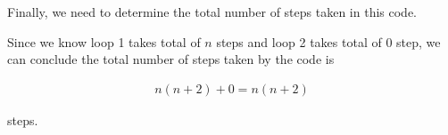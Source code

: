 \documentclass[12pt]{article}
\begin{document}
\begin{enumerate}[a.]
    \bigskip

    Finally, we need to determine the total number of steps taken in this code.

    \bigskip

    Since we know loop 1 takes total of $n$ steps and loop 2 takes total of 0 step, we can
    conclude the total number of steps taken by the code is

    \begin{align}
        n(n+2) + 0 = n(n+2)
    \end{align}

    steps.

    \bigskip














\end{enumerate}
\end{document}
